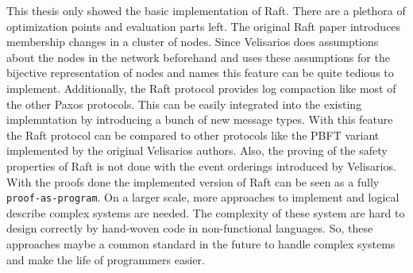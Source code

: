 This thesis only showed the basic implementation of
Raft. There are a plethora of optimization points
and evaluation parts left. The original Raft paper
introduces membership changes in a cluster of nodes.
Since Velisarios does assumptions about the nodes
in the network beforehand and uses these assumptions
for the bijective representation of nodes and names
this feature can be quite tedious to implement.
Additionally, the Raft protocol provides log
compaction like most of the other Paxos protocols.
This can be easily integrated into the existing
implemntation by introducing a bunch of new message
types. With this feature the Raft protocol can be
compared to other protocols like the PBFT variant
implemented by the original Velisarios authors.
Also, the proving of the safety properties of
Raft is not done with the event orderings
introduced by Velisarios. With the proofs
done the implemented version of Raft
can be seen as a fully \texttt{proof-as-program}.
On a larger scale, more approaches to implement and
logical describe complex systems are needed. The
complexity of these system are hard to design
correctly by hand-woven code in non-functional
languages. So, these approaches maybe a common
standard in the future to handle complex systems
and make the life of programmers easier.




